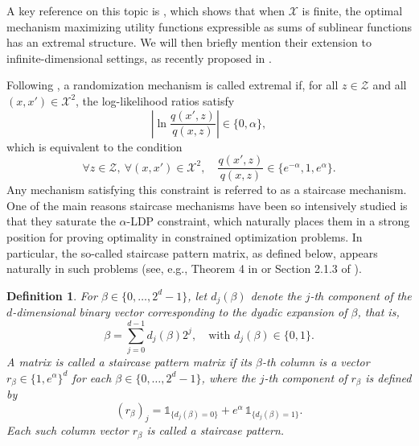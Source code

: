 \documentclass[a4paper, 11pt]{article}
\newtheorem{df}{Definition}
\theoremstyle{definition}
\begin{document}
{A key reference on this topic is \cite{kairouz2016extremal}, which shows that when $\mathcal{X}$ is finite, the optimal mechanism maximizing utility functions expressible as sums of sublinear functions has an extremal structure. We will then briefly mention their extension to infinite-dimensional settings, as recently proposed in \cite{amorino2025factorization}.  

Following \cite{kairouz2016extremal}, a randomization mechanism is called extremal if, for all $z \in \mathcal{Z}$ and all $(x, x') \in \mathcal{X}^2$, the log-likelihood ratios satisfy
\[
\left| \ln \frac{q(x',z)}{q(x,z)} \right| \in \{0, \alpha\},
\]
which is equivalent to the condition
\begin{equation}\label{eq : extremal constrainte discret}
\forall z \in \mathcal{Z}, \ \forall (x,x') \in \mathcal{X}^2, \quad \frac{q(x',z)}{q(x,z)} \in \{e^{-\alpha}, 1, e^\alpha\}.
\end{equation}
Any mechanism satisfying this constraint is referred to as a staircase mechanism. One of the main reasons staircase mechanisms have been so intensively studied is that they saturate the $\alpha$-LDP constraint, which naturally places them in a strong position for proving optimality in constrained optimization problems. In particular, the so-called staircase pattern matrix, as defined below, appears naturally in such problems (see, e.g., Theorem 4 in \cite{kairouz2016extremal} or Section 2.1.3 of \cite{kalinin2024efficient}).

\begin{df}\label{def: staircase matrix}
For $\beta \in \{0, \dots, 2^d - 1\}$, let $d_j(\beta)$ denote the $j$-th component of the $d$-dimensional binary vector corresponding to the dyadic expansion of $\beta$, that is,
\[
\beta = \sum_{j=0}^{d-1} d_j(\beta) 2^j, \quad \text{with } d_j(\beta) \in \{0, 1\}.
\]
A matrix is called a staircase pattern matrix if its $\beta$-th column is a vector $r_\beta \in \{1, e^\alpha\}^d$ for each $\beta \in \{0, \dots, 2^d - 1\}$, where the $j$-th component of $r_\beta$ is defined by
\[
(r_\beta)_j = \mathds{1}_{\{d_j(\beta) = 0\}} + e^\alpha \, \mathds{1}_{\{d_j(\beta) = 1\}}.
\]
Each such column vector $r_\beta$ is called a staircase pattern.
\end{df}

}
\end{document}
